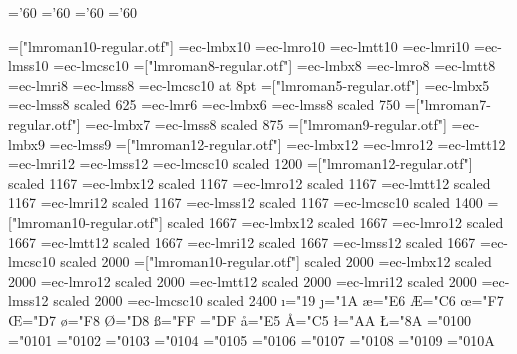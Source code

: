 \skewchar\sixbsy='60
\skewchar\sevenbsy='60
\skewchar\eightbsy='60
\skewchar\ninebsy='60
\ifx\ifLMT\relax%
\immediate{}
\font\tenrm=["lmroman10-regular.otf"]%
\font\tenbf=ec-lmbx10
\font\tensl=ec-lmro10
\font\tentt=ec-lmtt10
\font\tenit=ec-lmri10
\font\tenss=ec-lmss10
\font\tencsc=ec-lmcsc10
\font\eightrm=["lmroman8-regular.otf"]%
\font\eightbf=ec-lmbx8
\font\eightsl=ec-lmro8
\font\eighttt=ec-lmtt8
\font\eightit=ec-lmri8
\font\eightss=ec-lmss8
\font\eightcsc=ec-lmcsc10 at 8pt
\font\fiverm=["lmroman5-regular.otf"]%
\font\fivebf=ec-lmbx5
\font\fivess=ec-lmss8 scaled 625
\font\sixrm=ec-lmr6
\font\sixbf=ec-lmbx6
\font\sixss=ec-lmss8 scaled 750
\font\sevenrm=["lmroman7-regular.otf"]%
\font\sevenbf=ec-lmbx7
\font\sevenss=ec-lmss8 scaled 875
\font\ninerm=["lmroman9-regular.otf"]%
\font\ninebf=ec-lmbx9
\font\niness=ec-lmss9
\font\twelverm=["lmroman12-regular.otf"]%
\font\twelvebf=ec-lmbx12
\font\twelvesl=ec-lmro12
\font\twelvett=ec-lmtt12
\font\twelveit=ec-lmri12
\font\twelvess=ec-lmss12
\font\twelvecsc=ec-lmcsc10 scaled 1200
\font\fourteenrm=["lmroman12-regular.otf"] scaled 1167%
\font\fourteenbf=ec-lmbx12 scaled 1167
\font\fourteensl=ec-lmro12 scaled 1167
\font\fourteentt=ec-lmtt12 scaled 1167
\font\fourteenit=ec-lmri12 scaled 1167
\font\fourteenss=ec-lmss12 scaled 1167
\font\fourteencsc=ec-lmcsc10 scaled 1400
\font\twentyrm=["lmroman10-regular.otf"] scaled 1667%
\font\twentybf=ec-lmbx12 scaled 1667
\font\twentysl=ec-lmro12 scaled 1667
\font\twentytt=ec-lmtt12 scaled 1667
\font\twentyit=ec-lmri12 scaled 1667
\font\twentyss=ec-lmss12 scaled 1667
\font\twentycsc=ec-lmcsc10 scaled 2000
\font\twentyfourrm=["lmroman10-regular.otf"] scaled 2000%
\font\twentyfourbf=ec-lmbx12 scaled 2000
\font\twentyfoursl=ec-lmro12 scaled 2000
\font\twentyfourtt=ec-lmtt12 scaled 2000
\font\twentyfourit=ec-lmri12 scaled 2000
\font\twentyfourss=ec-lmss12 scaled 2000
\font\twentyfourcsc=ec-lmcsc10 scaled 2400
\chardef\i="19 \chardef\j="1A
\chardef\ae="E6 \chardef\AE="C6
\chardef\oe="F7 \chardef\OE="D7
\chardef\o="F8 \chardef\O="D8
\chardef\ss="FF \chardef\SS="DF
\chardef\aa="E5 \chardef\AA="C5
\chardef\l="AA \chardef\L="8A
\mathchardef\Gamma="0100
\mathchardef\Delta="0101
\mathchardef\Theta="0102
\mathchardef\Lambda="0103
\mathchardef\Xi="0104
\mathchardef\Pi="0105
\mathchardef\Sigma="0106
\mathchardef\Upsilon="0107
\mathchardef\Phi="0108
\mathchardef\Psi="0109
\mathchardef\Omega="010A
\def\hbar{{\mathchar"7009\mkern-9muh}}

